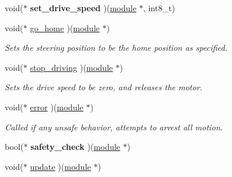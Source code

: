 \begin{DoxyCompactItemize}
\item 
\hypertarget{structmodule__assembly_a2b9f569a74bd58b94c4dfcd6b357766c}{}void($\ast$ {\bfseries set\+\_\+drive\+\_\+speed} )(\hyperlink{structmodule__assembly}{module} $\ast$, int8\+\_\+t)\label{structmodule__assembly_a2b9f569a74bd58b94c4dfcd6b357766c}

\item 
\hypertarget{structmodule__assembly_a80737be0fefbe26802d22311575178cc}{}void($\ast$ \hyperlink{structmodule__assembly_a80737be0fefbe26802d22311575178cc}{go\+\_\+home} )(\hyperlink{structmodule__assembly}{module} $\ast$)\label{structmodule__assembly_a80737be0fefbe26802d22311575178cc}

\begin{DoxyCompactList}\small\item\em Sets the steering position to be the home position as specified. \end{DoxyCompactList}\item 
\hypertarget{structmodule__assembly_a5822c3dd913339f91555c66671c7d959}{}void($\ast$ \hyperlink{structmodule__assembly_a5822c3dd913339f91555c66671c7d959}{stop\+\_\+driving} )(\hyperlink{structmodule__assembly}{module} $\ast$)\label{structmodule__assembly_a5822c3dd913339f91555c66671c7d959}

\begin{DoxyCompactList}\small\item\em Sets the drive speed to be zero, and releases the motor. \end{DoxyCompactList}\item 
\hypertarget{structmodule__assembly_acf7475b3f29ca0e782f1ba61c3f91e89}{}void($\ast$ \hyperlink{structmodule__assembly_acf7475b3f29ca0e782f1ba61c3f91e89}{error} )(\hyperlink{structmodule__assembly}{module} $\ast$)\label{structmodule__assembly_acf7475b3f29ca0e782f1ba61c3f91e89}

\begin{DoxyCompactList}\small\item\em Called if any unsafe behavior, attempts to arrest all motion. \end{DoxyCompactList}\item 
\hypertarget{structmodule__assembly_a1ca841fb37dd79a0180306b93f45ef76}{}bool($\ast$ {\bfseries safety\+\_\+check} )(\hyperlink{structmodule__assembly}{module} $\ast$)\label{structmodule__assembly_a1ca841fb37dd79a0180306b93f45ef76}

\item 
\hypertarget{structmodule__assembly_a5acad1911db4706aa0a24c13f0ef74e6}{}void($\ast$ \hyperlink{structmodule__assembly_a5acad1911db4706aa0a24c13f0ef74e6}{update} )(\hyperlink{structmodule__assembly}{module} $\ast$)\label{structmodule__assembly_a5acad1911db4706aa0a24c13f0ef74e6}


\end{DoxyCompactItemize}
